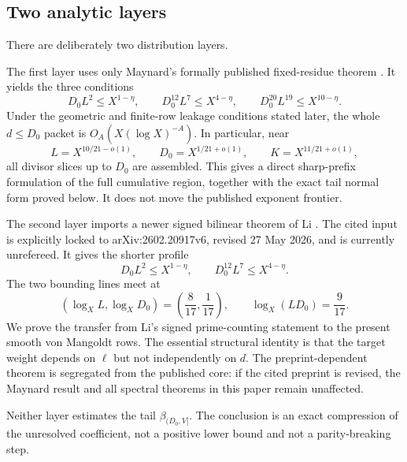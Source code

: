 \subsection{Two analytic layers}

There are deliberately two distribution layers.

The first layer uses only Maynard's formally published fixed-residue
theorem \citep[Theorem~1.1]{Maynard2025I}.  It yields the three
conditions
\begin{equation}
 D_0L^2\le X^{1-\eta},
 \qquad
 D_0^{12}L^7\le X^{4-\eta},
 \qquad
 D_0^{20}L^{19}\le X^{10-\eta}.
 \label{eq:maynard-profile-intro}
\end{equation}
Under the geometric and finite-row leakage conditions stated later,
the whole $d\le D_0$ packet is $O_A(X(\log X)^{-A})$.  In particular,
near
\begin{equation}
 L=X^{10/21-o(1)},
 \qquad
 D_0=X^{1/21+o(1)},
 \qquad
 K=X^{11/21+o(1)},
 \label{eq:published-scales-intro}
\end{equation}
all divisor slices up to $D_0$ are assembled.  This gives a direct
sharp-prefix formulation of the full cumulative region, together with
the exact tail normal form proved below.  It does not move the published
exponent frontier.

The second layer imports a newer signed bilinear theorem of Li
\citep[Theorem~1.1]{Li2026v6}.  The cited input is explicitly locked to
arXiv:2602.20917v6, revised 27 May 2026, and is currently unrefereed.
It gives the shorter profile
\begin{equation}
 D_0L^2\le X^{1-\eta},
 \qquad
 D_0^{12}L^7\le X^{4-\eta}.
 \label{eq:li-profile-intro}
\end{equation}
The two bounding lines meet at
\begin{equation}
 (\log_XL,\log_XD_0)
 =\left(\frac8{17},\frac1{17}\right),
 \qquad
 \log_X(LD_0)=\frac9{17}.
 \label{eq:li-vertex-intro}
\end{equation}
We prove the transfer from Li's signed prime-counting statement to the
present smooth von Mangoldt rows.  The essential structural identity is
that the target weight depends on $\ell$ but not independently on $d$.
The preprint-dependent theorem is segregated from the published core:
if the cited preprint is revised, the Maynard result and all spectral
theorems in this paper remain unaffected.

Neither layer estimates the tail $\beta_{(D_0,V]}$.  The conclusion is
an exact compression of the unresolved coefficient, not a positive
lower bound and not a parity-breaking step.

